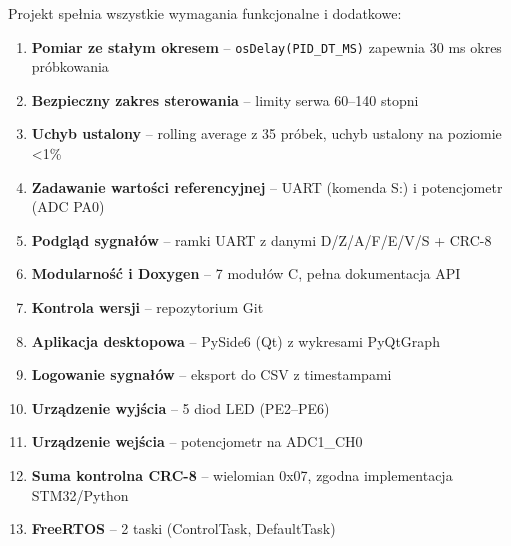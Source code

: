 \documentclass[11pt]{article}
\begin{document}
Projekt spełnia wszystkie wymagania funkcjonalne i dodatkowe:

\begin{enumerate}
    \item \textbf{Pomiar ze stałym okresem} -- \texttt{osDelay(PID\_DT\_MS)} zapewnia 30 ms okres próbkowania
    \item \textbf{Bezpieczny zakres sterowania} -- limity serwa 60--140 stopni
    \item \textbf{Uchyb ustalony} -- rolling average z 35 próbek, uchyb ustalony na poziomie <1\%
    \item \textbf{Zadawanie wartości referencyjnej} -- UART (komenda S:) i potencjometr (ADC PA0)
    \item \textbf{Podgląd sygnałów} -- ramki UART z danymi D/Z/A/F/E/V/S + CRC-8
    \item \textbf{Modularność i Doxygen} -- 7 modułów C, pełna dokumentacja API
    \item \textbf{Kontrola wersji} -- repozytorium Git
    \item \textbf{Aplikacja desktopowa} -- PySide6 (Qt) z wykresami PyQtGraph
    \item \textbf{Logowanie sygnałów} -- eksport do CSV z timestampami
    \item \textbf{Urządzenie wyjścia} -- 5 diod LED (PE2--PE6)
    \item \textbf{Urządzenie wejścia} -- potencjometr na ADC1\_CH0
    \item \textbf{Suma kontrolna CRC-8} -- wielomian 0x07, zgodna implementacja STM32/Python
    \item \textbf{FreeRTOS} -- 2 taski (ControlTask, DefaultTask)
\end{enumerate}
\end{document}
